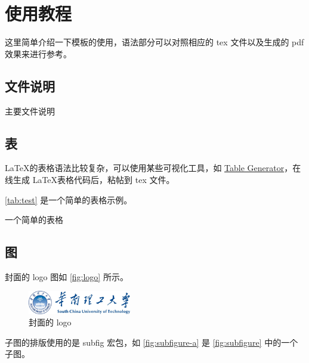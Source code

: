 \chapter{使用教程}

这里简单介绍一下模板的使用，语法部分可以对照相应的 tex 文件以及生成的 pdf 效果来进行参考。

\section{文件说明}

\begin{table}[htbp]
    \centering
    \caption{主要文件说明}
    \label{tab:file-description}
    
\end{table}

\section{表}

\LaTeX 的表格语法比较复杂，可以使用某些可视化工具，如 \href{https://www.tablesgenerator.com/}{Table Generator}，在线生成 \LaTeX 表格代码后，粘帖到 tex 文件。

\autoref{tab:test} 是一个简单的表格示例。

\begin{table}[htbp]
    \centering
    \caption{一个简单的表格}
    \label{tab:test}
    
\end{table}

\section{图}

封面的 logo 图如 \autoref{fig:logo} 所示。

\begin{figure}[htbp]
    \centering
    \caption{封面的 logo}
    \label{fig:logo}
    \includegraphics[width=0.4\textwidth]{img/logo.png}
\end{figure}

子图的排版使用的是 subfig 宏包，如 \autoref{fig:subfigure-a} 是 \autoref{fig:subfigure} 中的一个子图。


